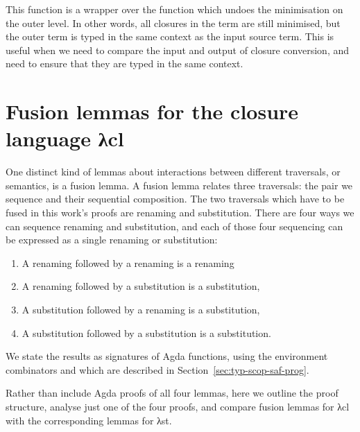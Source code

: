 \documentclass[bsc,frontabs,oneside,singlespacing,parskip,deptreport]{infthesis}
\theoremstyle{definition}
\theoremstyle{lemma}
\begin{document}

This function is a wrapper over the  function which undoes
the minimisation on the outer level. In other words, all closures in
the term are still minimised, but the outer term is typed in the same
context as the input source term. This is useful when we need to
compare the input and output of closure conversion, and need to ensure
that they are typed in the same context.

\section{Fusion lemmas for the closure language λcl}

One distinct kind of lemmas about interactions between different
traversals, or semantics, is a fusion lemma.  A fusion lemma relates
three traversals: the pair we sequence and their sequential
composition. The two traversals which have to be fused in this work's
proofs are renaming and substitution. There are four ways we can
sequence renaming and substitution, and each of those four sequencing
can be expressed as a single renaming or substitution:

\begin{enumerate}[nolistsep]
  \item A renaming followed by a renaming is a renaming
  \item A renaming followed by a substitution is a substitution,
  \item A substitution followed by a renaming is a substitution,
  \item A substitution followed by a substitution is a substitution.
\end{enumerate}

We state the results as signatures of Agda functions, using the
environment combinators \AS{\_<\$>\_} and  which are described
in Section~\ref{sec:typ-scop-saf-prog}.


Rather than include Agda proofs of all four lemmas, here we outline
the proof structure, analyse just one of the four proofs, and compare
fusion lemmas for λcl with the corresponding lemmas for λst.
\end{document}
